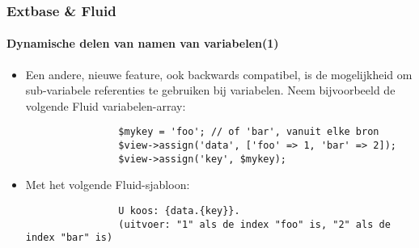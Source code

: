 \begin{frame}[fragile]
	\frametitle{Extbase \& Fluid}
	\framesubtitle{Dynamische delen van namen van variabelen(1)}

	\lstset{basicstyle=\tiny\ttfamily}

	\begin{itemize}

		\item Een andere, nieuwe feature, ook backwards compatibel, is de mogelijkheid
			om sub-variabele referenties te gebruiken bij variabelen.
			Neem bijvoorbeeld de volgende Fluid variabelen-array:

			\begin{lstlisting}
				$mykey = 'foo'; // of 'bar', vanuit elke bron
				$view->assign('data', ['foo' => 1, 'bar' => 2]);
				$view->assign('key', $mykey);
			\end{lstlisting}

		\item Met het volgende Fluid-sjabloon:

			\begin{lstlisting}
				U koos: {data.{key}}.
				(uitvoer: "1" als de index "foo" is, "2" als de index "bar" is)
			\end{lstlisting}

	\end{itemize}

\end{frame}


